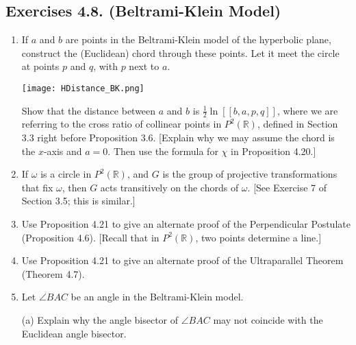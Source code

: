 \documentclass[leqno]{book}
\begin{document}
\subsection*{Exercises 4.8. (Beltrami-Klein Model)} %
\begin{enumerate}
\item If $a$ and $b$ are points in the Beltrami-Klein model of the hyperbolic plane, construct the (Euclidean) chord through these points.  Let it meet the circle at points $p$ and $q$, with $p$ next to $a$.
\begin{center}\texttt{[image: HDistance\_BK.png]}\end{center}
Show that the distance between $a$ and $b$ is $\frac 12\ln[\![b,a,p,q]\!]$, where we are referring to the cross ratio of collinear points in $P^2(\mathbb R)$, defined in Section 3.3 right before Proposition 3.6.  [Explain why we may assume the chord is the $x$-axis and $a=0$.  Then use the formula for $\chi$ in Proposition 4.20.]

\item If $\omega$ is a circle in $P^2(\mathbb R)$, and $G$ is the group of projective transformations that fix $\omega$, then $G$ acts transitively on the chords of $\omega$.  [See Exercise 7 of Section 3.5; this is similar.] %

\item Use Proposition 4.21 to give an alternate proof of the Perpendicular Postulate (Proposition 4.6).  [Recall that in $P^2(\mathbb R)$, two points determine a line.]

\item Use Proposition 4.21 to give an alternate proof of the Ultraparallel Theorem (Theorem 4.7).

\item Let $\angle BAC$ be an angle in the Beltrami-Klein model.

(a) Explain why the angle bisector of $\angle BAC$ may not coincide with the Euclidean angle bisector.


\end{enumerate}
\end{document}

